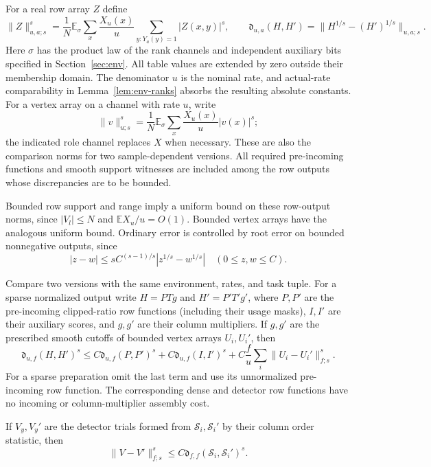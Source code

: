 For a real row array $Z$ define
\begin{equation}
 \|Z\|_{u,a;s}^s=
 \frac1N\mathbb E_\sigma\sum_x\frac{X_u(x)}u
                 \sum_{y:Y_a(y)=1}|Z(x,y)|^s,
 \qquad
 \mathfrak d_{u,a}(H,H')=
   \|H^{1/s}-(H')^{1/s}\|_{u,a;s}.
 \label{eq:atom-row-norm}
\end{equation}
Here $\sigma$ has the product law of the rank channels and independent
auxiliary bits specified in Section~\ref{sec:env}.  All table values are
extended by zero outside their membership domain.  The denominator $u$
is the nominal rate, and actual-rate comparability in
Lemma~\ref{lem:env-ranks} absorbs the resulting absolute constants.
For a vertex array on a channel with rate $u$, write
\begin{equation}
 \|v\|_{u;s}^s=
    \frac1N\mathbb E_\sigma\sum_x\frac{X_u(x)}u|v(x)|^s;
 \label{eq:atom-vertex-norm}
\end{equation}
the indicated role channel replaces $X$ when necessary.  These are also
the comparison norms for two sample-dependent versions.  All required
pre-incoming functions and smooth support witnesses are included among
the row outputs whose discrepancies are to be bounded.

Bounded row support and range imply a uniform bound on these row-output
norms, since $|V_l|\le N$ and $\mathbb E X_u/u=O(1)$.  Bounded vertex
arrays have the analogous uniform bound.  Ordinary error is controlled
by root error on bounded nonnegative outputs, since
\begin{equation}
 |z-w|\le s C^{(s-1)/s}|z^{1/s}-w^{1/s}|
 \quad(0\le z,w\le C).
 \label{eq:atom-ordinary-from-root}
\end{equation}

\begin{lemma}
\label{lem:atom-assembly}
Compare two versions with the same environment, rates, and task tuple.
For a sparse normalized output write $H=P T g$ and
$H'=P'T'g'$, where $P,P'$ are the pre-incoming clipped-ratio row
functions (including their usage masks), $I,I'$ are their auxiliary
scores, and $g,g'$ are their column multipliers.  If $g,g'$ are the
prescribed smooth cutoffs of bounded vertex arrays $U_i,U_i'$, then
\begin{equation}
 \mathfrak d_{u,f}(H,H')^s
 \le C\mathfrak d_{u,f}(P,P')^s
    +C\mathfrak d_{u,f}(I,I')^s
    +C\frac fu\sum_i\|U_i-U_i'\|_{f;s}^s.
 \label{eq:atom-assembly-bound}
\end{equation}
For a sparse preparation omit the last term and use its unnormalized
pre-incoming row function.  The corresponding dense and detector row
functions have no incoming or column-multiplier assembly cost.

If $V_y,V_y'$ are the detector trials formed from
$\mathcal S_i,\mathcal S_i'$ by their column order statistic, then
\begin{equation}
 \|V-V'\|_{f;s}^s
   \le C\mathfrak d_{f,f}(\mathcal S_i,\mathcal S_i')^s.
 \label{eq:atom-detector-comparison}
\end{equation}
\end{lemma}


